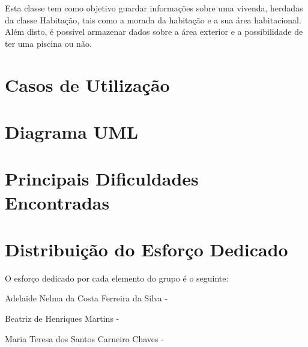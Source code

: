 \documentclass[a4paper]{article}
\begin{document}
Esta classe tem como objetivo guardar informações sobre uma vivenda, herdadas da classe Habitação, tais como a morada da habitação e a sua área habitacional. Além disto, é possível armazenar dados sobre a área exterior e a possibilidade de ter uma piscina ou não.

\newpage

\section{Casos de Utilização}


\newpage

\section{Diagrama UML}

\newpage

\section{Principais Dificuldades Encontradas}


\newpage

\section{Distribuição do Esforço Dedicado}

O esforço dedicado por cada elemento do grupo é o seguinte: \newline

Adelaide Nelma da Costa Ferreira da Silva - \newline

Beatriz de Henriques Martins - \newline

Maria Teresa dos Santos Carneiro Chaves - 

\newpage
\end{document}
